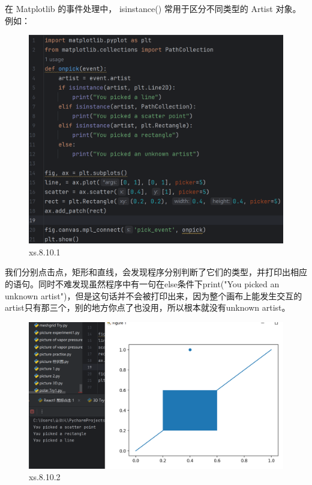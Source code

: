 \documentclass[12pt]{article}
\begin{document}
在 Matplotlib 的事件处理中，  isinstance()   常用于区分不同类型的   Artist   对象。例如：
\begin{figure}[H]
    \centering
    \includegraphics[width=0.75\linewidth]{isinstance program1.png}
    \caption{xs.8.10.1}
    \label{fig:enter-label}
\end{figure}
我们分别点击点，矩形和直线，会发现程序分别判断了它们的类型，并打印出相应的语句。同时不难发现虽然程序中有一句在else条件下print("You picked an unknown artist")，但是这句话并不会被打印出来，因为整个画布上能发生交互的artist只有那三个，别的地方你点了也没用，所以根本就没有unknown artist。
\begin{figure}[H]
    \centering
    \includegraphics[width=1\linewidth]{isinstance outcome1.png}
    \caption{xs.8.10.2}
    \label{fig:enter-label}
\end{figure}





    



\end{document}
